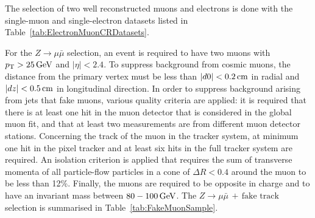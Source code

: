 The selection of two well reconstructed muons and electrons is done with the single-muon and single-electron datasets listed in Table~\ref{tab:ElectronMuonCRDatasets}.
\renewcommand{\arraystretch}{1.5}
\begin{table}[!h]
\centering
\caption{Datasets used for the determination of the fake rate.}
\label{tab:ElectronMuonCRDatasets}
\end{table}  
For the $Z\rightarrow\mu\bar{\mu}$ selection, an event is required to have two muons with $p_{\text{T}}>25\,\text{Ge}\kern-0.06667em\text{V}$ and $|\eta|<2.4$.
To suppress background from cosmic muons, the distance from the primary vertex must be less than $|d0|<0.2\,\text{cm}$ in radial and $|dz|<0.5\,\text{cm}$ in longitudinal direction.
In order to suppress background arising from jets that fake muons, various quality criteria are applied: it is required that there is at least one hit in the muon detector that is considered in the global muon fit, 
and that at least two measurements are from different muon detector stations.
Concerning the track of the muon in the tracker system, at minimum one hit in the pixel tracker and at least six hits in the full tracker system are required. 
An isolation criterion is applied that requires the sum of transverse momenta of all particle-flow particles in a cone of $\Delta R<0.4$ around the muon  to be less than 12\%.
Finally, the muons are required to be opposite in charge and to have an invariant mass between $80-100\,\text{Ge}\kern-0.06667em\text{V}$.
The $Z\rightarrow\mu\bar{\mu}\,+\,\text{fake track}$ selection is summarised in Table~\ref{tab:FakeMuonSample}.
